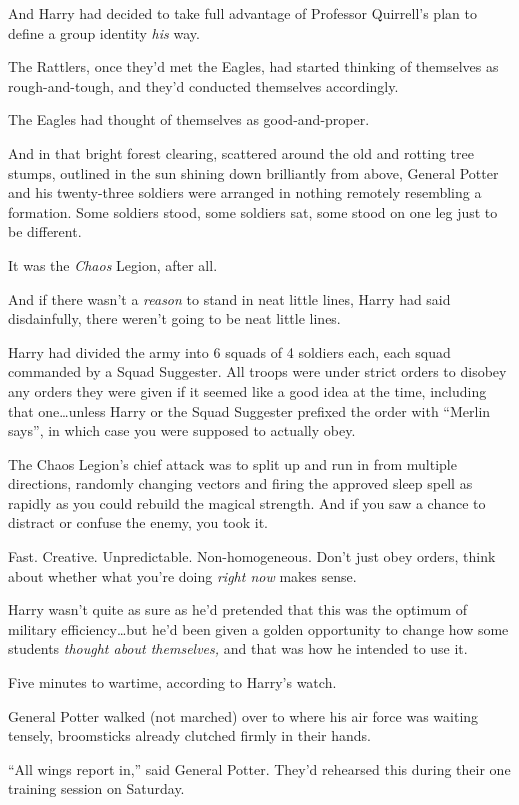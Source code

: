 And Harry had decided to take full advantage of Professor Quirrell’s plan to define a group identity \emph{his} way.

The Rattlers, once they’d met the Eagles, had started thinking of themselves as rough-and-tough, and they’d conducted themselves accordingly.

The Eagles had thought of themselves as good-and-proper.

And in that bright forest clearing, scattered around the old and rotting tree stumps, outlined in the sun shining down brilliantly from above, General Potter and his twenty-three soldiers were arranged in nothing remotely resembling a formation. Some soldiers stood, some soldiers sat, some stood on one leg just to be different.

It was the \emph{Chaos} Legion, after all.

And if there wasn’t a \emph{reason} to stand in neat little lines, Harry had said disdainfully, there weren’t going to be neat little lines.

Harry had divided the army into 6 squads of 4 soldiers each, each squad commanded by a Squad Suggester. All troops were under strict orders to disobey any orders they were given if it seemed like a good idea at the time, including that one…unless Harry or the Squad Suggester prefixed the order with “Merlin says”, in which case you were supposed to actually obey.

The Chaos Legion’s chief attack was to split up and run in from multiple directions, randomly changing vectors and firing the approved sleep spell as rapidly as you could rebuild the magical strength. And if you saw a chance to distract or confuse the enemy, you took it.

Fast. Creative. Unpredictable. Non-homogeneous. Don’t just obey orders, think about whether what you’re doing \emph{right now} makes sense.

Harry wasn’t quite as sure as he’d pretended that this was the optimum of military efficiency…but he’d been given a golden opportunity to change how some students \emph{thought about themselves,} and that was how he intended to use it.

Five minutes to wartime, according to Harry’s watch.

General Potter walked (not marched) over to where his air force was waiting tensely, broomsticks already clutched firmly in their hands.

“All wings report in,” said General Potter. They’d rehearsed this during their one training session on Saturday.

